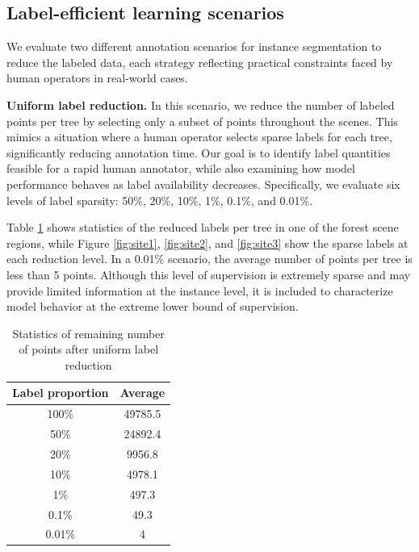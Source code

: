 \documentclass[review,authoryear]{elsarticle}
\begin{document}
\subsection{Label-efficient learning scenarios}
\label{reduction_strategy}

We evaluate two different annotation scenarios for instance segmentation to reduce the labeled data, each strategy reflecting practical constraints faced by human operators in real-world cases.

\textbf{Uniform label reduction.} In this scenario, we reduce the number of labeled points per tree by selecting only a subset of points throughout the scenes. This mimics a situation where a human operator selects sparse labels for each tree, significantly reducing annotation time. Our goal is to identify label quantities feasible for a rapid human annotator, while also examining how model performance behaves as label availability decreases. Specifically, we evaluate six levels of label sparsity: 50\%, 20\%, 10\%, 1\%, 0.1\%, and 0.01\%. 

Table \ref{tab:stats_reduced} shows statistics of the reduced labels per tree in one of the forest scene regions, while Figure \ref{fig:site1}, \ref{fig:site2}, and \ref{fig:site3} show the sparse labels at each reduction level. In a 0.01\% scenario, the average number of points per tree is less than 5 points. Although this level of supervision is extremely sparse and may provide limited information at the instance level, it is included to characterize model behavior at the extreme lower bound of supervision. 



\begin{table}[h]
    \centering
    \caption{Statistics of remaining number of points after uniform label reduction}
    \begin{tabular}{c|c}
        \hline
        \textbf{Label proportion} & \textbf{Average} \\
        \hline
        100\% & 49785.5 \\
        50\% & 24892.4 \\ 
        20\% & 9956.8 \\
        10\% & 4978.1 \\
        1\% & 497.3 \\
        0.1\% & 49.3 \\
        0.01\% & 4 \\
        \hline
    \end{tabular}
    \label{tab:stats_reduced}
\end{table}
\end{document}
